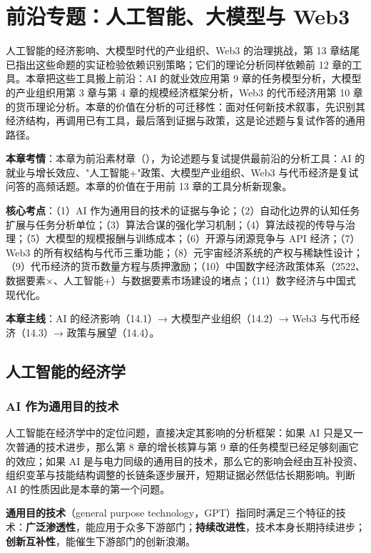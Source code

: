 \chapter{前沿专题：人工智能、大模型与 Web3}

人工智能的经济影响、大模型时代的产业组织、Web3 的治理挑战，第 13 章结尾已指出这些命题的实证检验依赖识别策略；它们的理论分析同样依赖前 12 章的工具。本章把这些工具搬上前沿：AI 的就业效应用第 9 章的任务模型分析，大模型的产业组织用第 3 章与第 4 章的规模经济框架分析，Web3 的代币经济用第 10 章的货币理论分析。本章的价值在分析的可迁移性：面对任何新技术叙事，先识别其经济结构，再调用已有工具，最后落到证据与政策，这是论述题与复试作答的通用路径。

\begin{examguide}
\textbf{本章考情}：本章为前沿素材章（），为论述题与复试提供最前沿的分析工具：AI 的就业与增长效应、"人工智能+"政策、大模型产业组织、Web3 与代币经济是复试问答的高频话题。本章的价值在于用前 13 章的工具分析新现象。

\textbf{核心考点}：（1）AI 作为通用目的技术的证据与争论；（2）自动化边界的认知任务扩展与任务分析单位；（3）算法合谋的强化学习机制；（4）算法歧视的传导与治理；（5）大模型的规模报酬与训练成本；（6）开源与闭源竞争与 API 经济；（7）Web3 的所有权结构与代币三重功能；（8）元宇宙经济系统的产权与稀缺性设计；（9）代币经济的货币数量方程与质押激励；（10）中国数字经济政策体系（2522、数据要素×、人工智能+）与数据要素市场建设的堵点；（11）数字经济与中国式现代化。

\textbf{本章主线}：AI 的经济影响（14.1）→ 大模型产业组织（14.2）→ Web3 与代币经济（14.3）→ 政策与展望（14.4）。
\end{examguide}

\section{人工智能的经济学}

\subsection{AI 作为通用目的技术}

人工智能在经济学中的定位问题，直接决定其影响的分析框架：如果 AI 只是又一次普通的技术进步，那么第 8 章的增长核算与第 9 章的任务模型已经足够刻画它的效应；如果 AI 是与电力同级的通用目的技术，那么它的影响会经由互补投资、组织变革与技能结构调整的长链条逐步展开，短期证据必然低估长期影响。判断 AI 的性质因此是本章的第一个问题。

\begin{definition}
\textbf{通用目的技术}（general purpose technology，GPT）指同时满足三个特征的技术：\textbf{广泛渗透性}，能应用于众多下游部门；\textbf{持续改进性}，技术本身长期持续进步；\textbf{创新互补性}，能催生下游部门的创新浪潮。
\end{definition}

